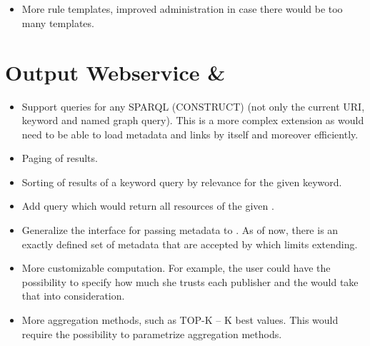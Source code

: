 \section{\DN}
\begin{itemize}
	\item More rule templates, improved administration in case there would be too many templates.
\end{itemize}

\section{Output Webservice \& \CR}
\begin{itemize}
 	\item Support queries for any SPARQL (CONSTRUCT) (not only the current URI, keyword and named graph query). This is a more complex extension as \CR would need to be able to load metadata and  links by itself and moreover efficiently.
	\item Paging of results.
	\item Sorting of results of a keyword query by relevance for the given keyword.
	\item Add query which would return all resources of the given .
	\item Generalize the interface for passing metadata to \CR. As of now, there is an exactly defined set of metadata that are accepted by \CR which limits extending.
	\item More customizable \aggrq computation. For example, the user could have the possibility to specify how much she trusts each publisher and the \aggrq would take that into consideration.
	\item More aggregation methods, such as TOP-K -- K best values. This would require the possibility to parametrize aggregation methods.
\end{itemize}

